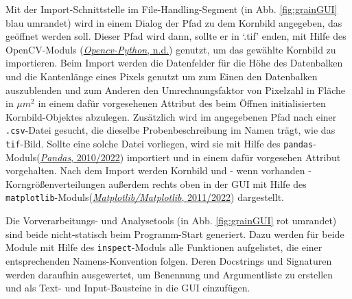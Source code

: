 \documentclass[
  12pt,
]{book}
\begin{document}
Mit der Import-Schnittstelle im File-Handling-Segment (in Abb. \ref{fig:grainGUI} blau umrandet) wird in einem Dialog der Pfad zu dem Kornbild angegeben, das geöffnet werden soll. Dieser Pfad wird dann, sollte er in `.tif' enden, mit Hilfe des OpenCV-Moduls (\protect\hyperlink{ref-OpencvpythonWrapperPackage}{\emph{Opencv-Python}, n.d.}) genutzt, um das gewählte Kornbild zu importieren. Beim Import werden die Datenfelder für die Höhe des Datenbalken und die Kantenlänge eines Pixels genutzt um zum Einen den Datenbalken auszublenden und zum Anderen den Umrechnungsfaktor von Pixelzahl in Fläche in \(\mu m^2\) in einem dafür vorgesehenen Attribut des beim Öffnen initialisierten Kornbild-Objektes abzulegen. Zusätzlich wird im angegebenen Pfad nach einer \texttt{.csv}-Datei gesucht, die dieselbe Probenbeschreibung im Namen trägt, wie das \texttt{tif}-Bild. Sollte eine solche Datei vorliegen, wird sie mit Hilfe des \texttt{pandas}-Moduls(\protect\hyperlink{ref-PandasPowerfulPython2022}{\emph{Pandas}, 2010/2022}) importiert und in einem dafür vorgesehen Attribut vorgehalten. Nach dem Import werden Kornbild und - wenn vorhanden - Korngrößenverteilungen außerdem rechts oben in der GUI mit Hilfe des \texttt{matplotlib}-Moduls(\protect\hyperlink{ref-MatplotlibMatplotlib2022}{\emph{Matplotlib/Matplotlib}, 2011/2022}) dargestellt.

Die Vorverarbeitungs- und Analysetools (in Abb. \ref{fig:grainGUI} rot umrandet) sind beide nicht-statisch beim Programm-Start generiert. Dazu werden für beide Module mit Hilfe des \texttt{inspect}-Moduls alle Funktionen aufgelistet, die einer entsprechenden Namens-Konvention folgen. Deren Docstrings und Signaturen werden daraufhin ausgewertet, um Benennung und Argumentliste zu erstellen und als Text- und Input-Bausteine in die GUI einzufügen.
\end{document}
